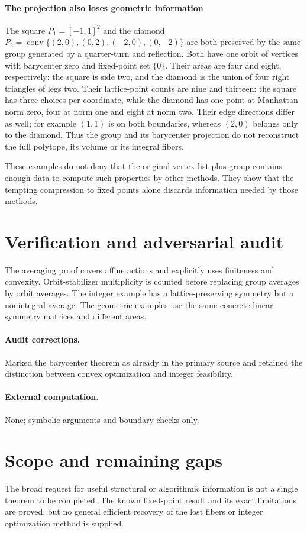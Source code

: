\documentclass[11pt]{article}
\begin{document}
\paragraph{The projection also loses geometric information}
The square $P_1=[-1,1]^2$ and the diamond $P_2=\operatorname{conv}\{(2,0),(0,2),(-2,0),(0,-2)\}$ are both preserved by the same group generated by a quarter-turn and reflection. Both have one orbit of vertices with barycenter zero and fixed-point set $\{0\}$. Their areas are four and eight, respectively: the square is side two, and the diamond is the union of four right triangles of legs two. Their lattice-point counts are nine and thirteen: the square has three choices per coordinate, while the diamond has one point at Manhattan norm zero, four at norm one and eight at norm two. Their edge directions differ as well; for example $(1,1)$ is on both boundaries, whereas $(2,0)$ belongs only to the diamond. Thus the group and its barycenter projection do not reconstruct the full polytope, its volume or its integral fibers.

These examples do not deny that the original vertex list plus group contains enough data to compute such properties by other methods. They show that the tempting compression to fixed points alone discards information needed by those methods.

\section{Verification and adversarial audit}
The averaging proof covers affine actions and explicitly uses finiteness and convexity. Orbit-stabilizer multiplicity is counted before replacing group averages by orbit averages. The integer example has a lattice-preserving symmetry but a nonintegral average. The geometric examples use the same concrete linear symmetry matrices and different areas.
\paragraph{Audit corrections.} Marked the barycenter theorem as already in the primary source and retained the distinction between convex optimization and integer feasibility.
\paragraph{External computation.} None; symbolic arguments and boundary checks only.
\section{Scope and remaining gaps}
The broad request for useful structural or algorithmic information is not a single theorem to be completed. The known fixed-point result and its exact limitations are proved, but no general efficient recovery of the lost fibers or integer optimization method is supplied.
\end{document}
